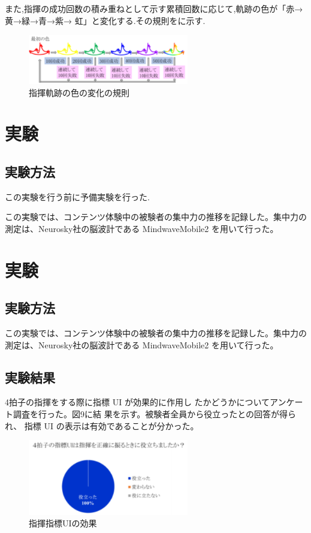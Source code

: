 \documentclass[uplatex]{jsarticle}   %
\begin{document}
また,指揮の成功回数の積み重ねとして示す累積回数に応じて,軌跡の色が「赤→黄→緑→青→紫→ 虹」と変化する.その規則をに示す.

\begin{figure}[t]
 \centering
 \includegraphics[clip,width=7cm]{sikisikumi.png}
 \caption{指揮軌跡の色の変化の規則}\label{fig:hoge}
\end{figure}



\section{実験}
\subsection{実験方法}
この実験を行う前に予備実験を行った.

この実験では、コンテンツ体験中の被験者の集中力の推移を記録した。集中力の測定は、Neurosky社の脳波計である MindwaveMobile2 を用いて行った。


\section{実験}
\subsection{実験方法}
この実験では、コンテンツ体験中の被験者の集中力の推移を記録した。集中力の測定は、Neurosky社の脳波計である MindwaveMobile2 を用いて行った。


\subsection{実験結果}
4拍子の指揮をする際に指標 UI が効果的に作用し たかどうかについてアンケート調査を行った。図9に結 果を示す。被験者全員から役立ったとの回答が得られ、 指標 UI の表示は有効であることが分かった。 
\begin{figure}[H]
 \centering
 \includegraphics[clip,width=7cm]{UIkouka.png}
 \caption{指揮指標UIの効果}\label{fig:hoge}
\end{figure}
\end{document}
